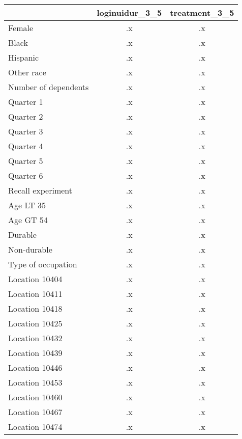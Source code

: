 \begin{tabular}{l*{2}{c}}
\hline\hline
                    &loginuidur\_3\_5&treatment\_3\_5\\
\hline
Female              &          .x&          .x\\
Black               &          .x&          .x\\
Hispanic            &          .x&          .x\\
Other race          &          .x&          .x\\
Number of dependents&          .x&          .x\\
Quarter 1           &          .x&          .x\\
Quarter 2           &          .x&          .x\\
Quarter 3           &          .x&          .x\\
Quarter 4           &          .x&          .x\\
Quarter 5           &          .x&          .x\\
Quarter 6           &          .x&          .x\\
Recall experiment   &          .x&          .x\\
Age LT 35           &          .x&          .x\\
Age GT 54           &          .x&          .x\\
Durable             &          .x&          .x\\
Non-durable         &          .x&          .x\\
Type of occupation  &          .x&          .x\\
Location 10404      &          .x&          .x\\
Location 10411      &          .x&          .x\\
Location 10418      &          .x&          .x\\
Location 10425      &          .x&          .x\\
Location 10432      &          .x&          .x\\
Location 10439      &          .x&          .x\\
Location 10446      &          .x&          .x\\
Location 10453      &          .x&          .x\\
Location 10460      &          .x&          .x\\
Location 10467      &          .x&          .x\\
Location 10474      &          .x&          .x\\

\end{tabular}

